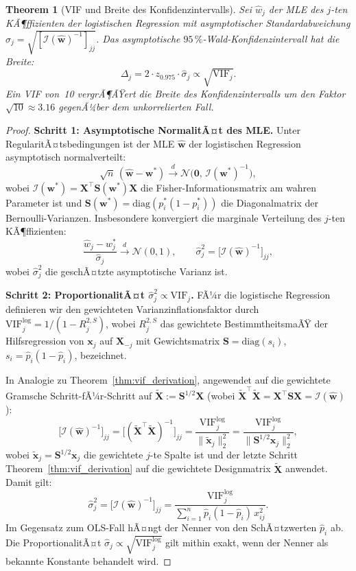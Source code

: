 ﻿\documentclass[12pt, a4paper]{article}
\newtheorem{theorem}{Theorem}[section]
\theoremstyle{definition}
\theoremstyle{remark}
\newcommand{\vw}{\bm{w}}
\newcommand{\vx}{\bm{x}}
\newcommand{\vX}{\bm{X}}
\newcommand{\vS}{\bm{S}}
\newcommand{\T}{\top}
\newcommand{\diag}{\mathrm{diag}}
\begin{document}
\begin{theorem}[VIF und Breite des Konfidenzintervalls]
	\label{thm:vif_ci}
	Sei $\hat{w}_j$ der MLE des $j$-ten KÃ¶ffizienten der logistischen Regression mit
	asymptotischer Standardabweichung $\hat{\sigma}_j = \sqrt{[\mathcal{I}(\hat{\vw})^{-1}]_{jj}}$.
	Das asymptotische $95\,\%$-Wald-Konfidenzintervall hat die Breite:
	\begin{equation}
		\Delta_j = 2 \cdot z_{0.975} \cdot \hat{\sigma}_j \propto \sqrt{\mathrm{VIF}_j}.
		\label{eq:ci_width}
	\end{equation}
	Ein VIF von~10 vergrÃ¶ÃŸert die Breite des Konfidenzintervalls um den Faktor $\sqrt{10} \approx 3.16$
	gegenÃ¼ber dem unkorrelierten Fall.
\end{theorem}

\begin{proof}
	\textbf{Schritt 1: Asymptotische NormalitÃ¤t des MLE.}
	Unter RegularitÃ¤tsbedingungen ist der MLE $\hat{\vw}$ der logistischen Regression
	asymptotisch normalverteilt:
	\[
	\sqrt{n}\,(\hat{\vw} - \vw^*) \xrightarrow{d} \mathcal{N}\!\bigl(\bm{0},\,\mathcal{I}(\vw^*)^{-1}\bigr),
	\]
	wobei $\mathcal{I}(\vw^*) = \vX^\T\vS(\vw^*)\vX$ die Fisher-Informationsmatrix am wahren
	Parameter ist und $\vS(\vw^*) = \diag(p_i^*(1-p_i^*))$ die Diagonalmatrix der Bernoulli-Varianzen.
	Insbesondere konvergiert die marginale Verteilung des $j$-ten KÃ¶ffizienten:
	\[
	\frac{\hat{w}_j - w_j^*}{\hat{\sigma}_j} \xrightarrow{d} \mathcal{N}(0,1),
	\qquad \hat{\sigma}_j^2 = \bigl[\mathcal{I}(\hat{\vw})^{-1}\bigr]_{jj},
	\]
	wobei $\hat{\sigma}_j^2$ die geschÃ¤tzte asymptotische Varianz ist.
	
	\textbf{Schritt 2: ProportionalitÃ¤t $\hat{\sigma}_j^2 \propto \mathrm{VIF}_j$.}
	FÃ¼r die logistische Regression definieren wir den gewichteten Varianzinflationsfaktor durch
	$\mathrm{VIF}_j^{\mathrm{log}} = 1/(1 - R_j^{2,S})$, wobei $R_j^{2,S}$ das gewichtete
	BestimmtheitsmaÃŸ der Hilfsregression von $\vx_j$ auf $\vX_{-j}$ mit Gewichtsmatrix
	$\vS = \diag(s_i)$, $s_i = \hat{p}_i(1-\hat{p}_i)$, bezeichnet.
	
	In Analogie zu Theorem~\ref{thm:vif_derivation}, angewendet auf die gewichtete Gramsche
	Schritt-fÃ¼r-Schritt auf $\tilde{\vX} := \vS^{1/2}\vX$ (wobei $\tilde{\vX}^\T\tilde{\vX} = \vX^\T\vS\vX = \mathcal{I}(\hat{\vw})$):
	\[
	\bigl[\mathcal{I}(\hat{\vw})^{-1}\bigr]_{jj}
	= \bigl[(\tilde{\vX}^\T\tilde{\vX})^{-1}\bigr]_{jj}
	= \frac{\mathrm{VIF}_j^{\mathrm{log}}}{\|\tilde{\vx}_j\|_2^2}
	= \frac{\mathrm{VIF}_j^{\mathrm{log}}}{\|\vS^{1/2}\vx_j\|_2^2},
	\]
	wobei $\tilde{\vx}_j = \vS^{1/2}\vx_j$ die gewichtete $j$-te Spalte ist und der letzte Schritt
	Theorem~\ref{thm:vif_derivation} auf die gewichtete Designmatrix $\tilde{\vX}$ anwendet.
	Damit gilt:
	\begin{equation}
		\hat{\sigma}_j^2 = \bigl[\mathcal{I}(\hat{\vw})^{-1}\bigr]_{jj}
		= \frac{\mathrm{VIF}_j^{\mathrm{log}}}{\sum_{i=1}^n \hat{p}_i(1-\hat{p}_i)\,x_{ij}^2}.
		\label{eq:sigma_vif_log}
	\end{equation}
	Im Gegensatz zum OLS-Fall hÃ¤ngt der Nenner von den SchÃ¤tzwerten $\hat{p}_i$ ab. Die
	ProportionalitÃ¤t $\hat{\sigma}_j \propto \sqrt{\mathrm{VIF}_j^{\mathrm{log}}}$ gilt mithin
	exakt, wenn der Nenner als bekannte Konstante behandelt wird.
	

\end{proof}
\end{document}

